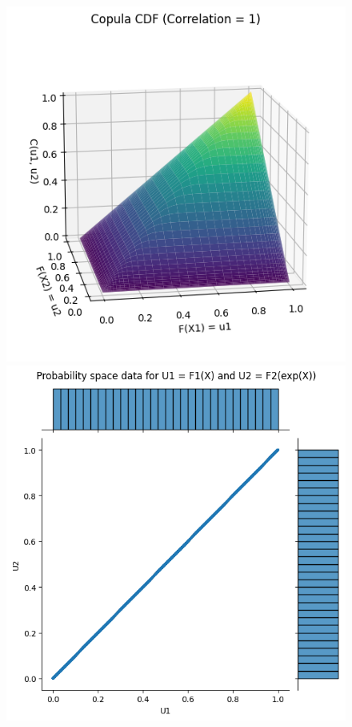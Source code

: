 \begin{figure}
    \label{fig:ExamplePlots}
    \centering
    \begin{minipage}{0.4\textwidth}
        \centering
        \includegraphics[width=\textwidth]{3Theory/pictures/TrueCopulaExponential.png}
        \subcaption{}
    \end{minipage}
    \hfill
    \begin{minipage}{0.4\textwidth}
        \centering
        \includegraphics[width=\textwidth]{3Theory/pictures/exponentialDependenceScatterProb.png}

\end{minipage}
\end{figure}
